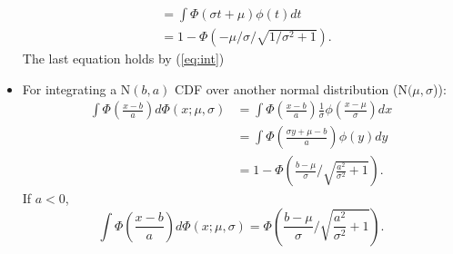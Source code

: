 \documentclass[12pt]{article}
\begin{document}
\begin{itemize}
\begin{align*}
    & = \int \Phi(\sigma t + \mu)\phi(t) dt \\
    & = 1 - \Phi(-\mu/\sigma/\sqrt{1/\sigma^2+1}).
  \end{align*}
  The last equation holds by (\ref{eq:int})
\item For integrating a $\textrm{N}(b, a)$ CDF over another normal
  distribution ($\textrm{N}(\mu, \sigma$)):
  \begin{align}
    \int \Phi \left( \frac{x-b}{a} \right) d\Phi(x; \mu, \sigma) & = \int \Phi \left( \frac{x-b}{a} \right) \frac{1}{\sigma} \phi \left( \frac{x-\mu}{\sigma} \right) dx \nonumber\\
    &= \int \Phi \left( \frac{\sigma y + \mu - b}{a}  \right) \phi(y) dy \nonumber \\
    \label{eq:intg1}
    & = 1- \Phi \left( \frac{b-\mu}{\sigma} /
      \sqrt{\frac{a^2}{\sigma^2}+1} \right).
  \end{align}
  If $a < 0$,
  \begin{equation}
    \label{eq:intg2}
    \int \Phi \left( \frac{x-b}{a} \right) d\Phi(x; \mu, \sigma) = \Phi \left( \frac{b-\mu}{\sigma} / \sqrt{\frac{a^2}{\sigma^2}+1} \right).
  \end{equation}

\end{itemize}
\end{document}
